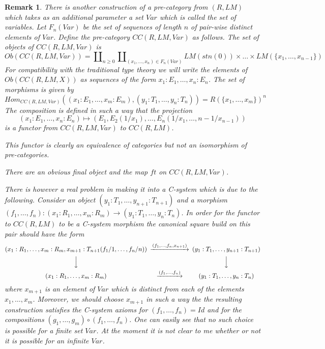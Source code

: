 \documentclass[11pt]{article}
\newtheorem{remark}[proposition]{Remark}
\newcommand{\sr}{\rightarrow}
\begin{document}
\begin{remark}\rm
There is another construction of a pre-category from $(R,LM)$ which takes as an additional parameter a set $Var$ which is called the set of variables. Let $F_n(Var)$ be the set of sequences of length $n$ of pair-wise distinct elements of $Var$. Define the pre-category $CC(R,LM,Var)$ as follows. The set of objects of $CC(R,LM,Var)$ is 
%
$$Ob(CC(R,LM,Var))= \amalg_{n\ge 0} \amalg_{(x_1,\dots,x_n)\in F_n(Var)} LM({stn(0)})\times\dots\times LM(\{x_1,\dots,x_{n-1}\})$$
%
For compatibility with the traditional type theory we will write the elements of $Ob(CC(R,LM,X))$ as sequences of the form $x_1:E_1,\dots,x_n:E_n$. The set of morphisms is given by
%
$$Hom_{CC(R,LM,Var)}((x_1:E_1,\dots,x_m:E_m),(y_1:T_1,\dots,y_n:T_n))=R(\{x_1,\dots,x_m\})^n$$
%
The composition is defined in such a way that the projection 
%
$$(x_1:E_1,\dots,x_n:E_n)\mapsto (E_1,E_2(1/x_1),\dots,E_n(1/x_1,\dots,n-1/x_{n-1}))$$
%
is a functor from $CC(R,LM,Var)$ to $CC(R,LM)$. 

This functor is clearly an equivalence of categories but not an isomorphism of pre-categories. 

There are an obvious final object and the map $ft$ on $CC(R,LM,Var)$. 

There is however a real problem in making it into a C-system  which is due to the following. Consider an object $(y_1:T_1,\dots,y_{n+1}:T_{n+1})$ and a morphism $(f_1,\dots,f_n):(x_1:R_1,\dots,x_m:R_m)\sr (y_1:T_1,\dots,y_{n}:T_{n})$. In order for the functor to $CC(R,LM)$ to be a C-system morphism the canonical square build on this pair should have the form
%
$$
\begin{CD}
(x_1:R_1,\dots,x_m:R_m,x_{m+1}:T_{n+1}(f_1/1,\dots, f_{n}/n)) @>(f_1,\dots,f_{n},x_{n+1})>> (y_1:T_1,\dots,y_{n+1}:T_{n+1})\\
@VVV @VVV\\
(x_1:R_1,\dots,x_m:R_m) @>(f_1,\dots,f_{n})>> (y_1:T_1,\dots,y_n:T_{n})
\end{CD}
$$
%
where $x_{m+1}$ is an element of $Var$ which is distinct from each of the elements $x_1,\dots,x_m$. Moreover, we should choose  $x_{m+1}$ in such a way the the resulting construction satisfies the C-system axioms for $(f_1,\dots,f_{n})=Id$ and for the compositions $(g_1,\dots,g_m)\circ (f_1,\dots,f_n)$. One can easily see that no such choice is possible for a finite set $Var$. At the moment it is not clear to me whether or not it is possible for an infinite $Var$.
\end{remark}
%
\end{document}
